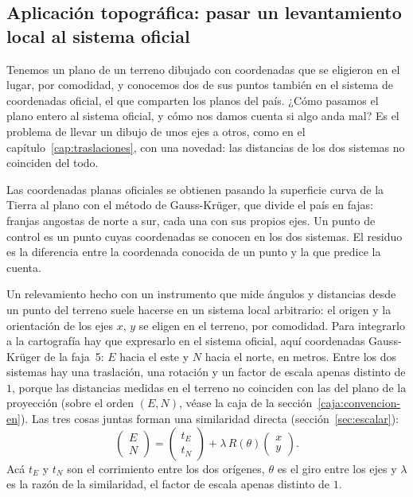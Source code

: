 \subsection{Aplicación topográfica: pasar un levantamiento local al sistema oficial}\label{sec:aplicacion-helmert}

Tenemos un plano de un terreno dibujado con coordenadas que se eligieron en el lugar, por
comodidad, y conocemos dos de sus puntos también en el sistema de coordenadas oficial, el que
comparten los planos del país. ¿Cómo pasamos el plano entero al sistema oficial, y cómo nos
damos cuenta si algo anda mal? Es el problema de llevar un dibujo de unos ejes a otros, como en
el capítulo~\ref{cap:traslaciones}, con una novedad: las distancias de los dos sistemas no
coinciden del todo.

\begin{idea}
Las coordenadas planas oficiales se obtienen pasando la superficie curva de la Tierra al plano
con el método de Gauss-Krüger, que divide el país en fajas: franjas angostas de norte a sur,
cada una con sus propios ejes. Un punto de control es un punto cuyas coordenadas se conocen en
los dos sistemas. El residuo es la diferencia entre la coordenada conocida de un punto y la que
predice la cuenta.
\end{idea}

Un relevamiento hecho con un instrumento que mide ángulos y distancias desde un punto del
terreno suele hacerse en un sistema local arbitrario: el origen y la orientación de los ejes
\(x\), \(y\) se eligen en el terreno, por comodidad. Para integrarlo a la cartografía hay que
expresarlo en el sistema oficial, aquí coordenadas Gauss-Krüger de la faja~5: \(E\) hacia el
este y \(N\) hacia el norte, en metros. Entre los dos sistemas hay una
traslación, una rotación y un factor de escala apenas distinto de \(1\), porque las
distancias medidas en el terreno no coinciden con las del plano de la proyección (sobre el
orden \((E,N)\), véase la caja de la sección~\ref{caja:convencion-en}). Las tres cosas juntas forman una
similaridad directa (sección~\ref{sec:escalar}):
\[
  \begin{pmatrix}E\\N\end{pmatrix}
  =\begin{pmatrix}t_E\\t_N\end{pmatrix}
  +\lambda\,R(\theta)\begin{pmatrix}x\\y\end{pmatrix}.
\]
Acá \(t_E\) y \(t_N\) son el corrimiento entre los dos orígenes, \(\theta\) es el giro entre
los ejes y \(\lambda\) es la razón de la similaridad, el factor de escala apenas distinto de
\(1\).

